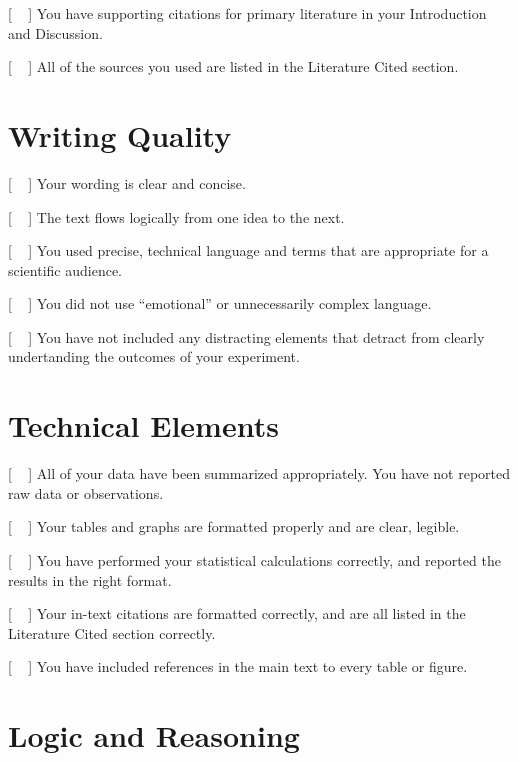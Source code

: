 \documentclass[
]{book}
\begin{document}
{[} ~ {]} You have supporting citations for primary literature in your Introduction and Discussion.

{[} ~ {]} All of the sources you used are listed in the Literature Cited section.

\hypertarget{writing-quality}{%
\section*{Writing Quality}\label{writing-quality}}

{[} ~ {]} Your wording is clear and concise.

{[} ~ {]} The text flows logically from one idea to the next.

{[} ~ {]} You used precise, technical language and terms that are appropriate for a scientific audience.

{[} ~ {]} You did not use ``emotional'' or unnecessarily complex language.

{[} ~ {]} You have not included any distracting elements that detract from clearly undertanding the outcomes of your experiment.

\hypertarget{technical-elements}{%
\section*{Technical Elements}\label{technical-elements}}

{[} ~ {]} All of your data have been summarized appropriately. You have not reported raw data or observations.

{[} ~ {]} Your tables and graphs are formatted properly and are clear, legible.

{[} ~ {]} You have performed your statistical calculations correctly, and reported the results in the right format.

{[} ~ {]} Your in-text citations are formatted correctly, and are all listed in the Literature Cited section correctly.

{[} ~ {]} You have included references in the main text to every table or figure.

\hypertarget{logic-and-reasoning}{%
\section*{Logic and Reasoning}\label{logic-and-reasoning}}
\end{document}
